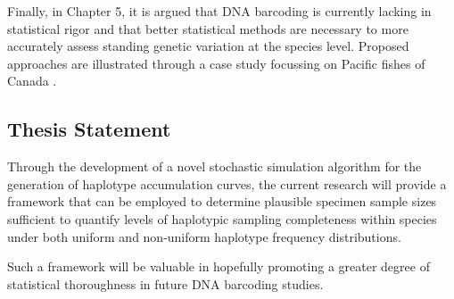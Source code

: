 \vspace{5mm}

Finally, in Chapter 5, it is argued that DNA barcoding is currently lacking in statistical rigor and that better statistical methods are necessary to more accurately assess standing genetic variation at the species level. Proposed approaches are illustrated through a case study focussing on Pacific fishes of Canada \cite{steinke2009dna}.

\vspace{5mm}

\subsection{Thesis Statement}

Through the development of a novel stochastic simulation algorithm for the generation of haplotype accumulation curves, the current research will provide a framework that can be employed to determine plausible specimen sample sizes sufficient to quantify levels of haplotypic sampling completeness within species under both uniform and non-uniform haplotype frequency distributions.

\vspace{5mm}

Such a framework will be valuable in hopefully promoting a greater degree of statistical thoroughness in future DNA barcoding studies. 



  
